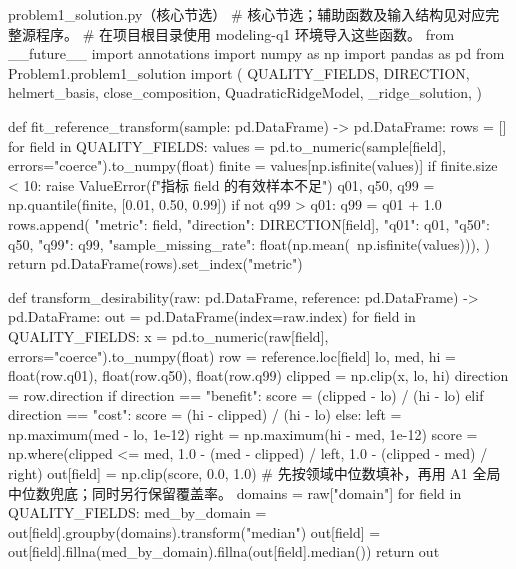 \documentclass[bwprint]{gmcmthesis}
\numberwithin{equation}{section}
\numberwithin{figure}{section}
\numberwithin{table}{section}
\begin{document}
\vspace{-2ex}
\begin{Python}{problem1\_solution.py（核心节选）}
# 核心节选；辅助函数及输入结构见对应完整源程序。
# 在项目根目录使用 modeling-q1 环境导入这些函数。
from __future__ import annotations
import numpy as np
import pandas as pd
from Problem1.problem1_solution import (
    QUALITY_FIELDS, DIRECTION, helmert_basis, close_composition,
    QuadraticRidgeModel, _ridge_solution,
)


def fit_reference_transform(sample: pd.DataFrame) -> pd.DataFrame:
    rows = []
    for field in QUALITY_FIELDS:
        values = pd.to_numeric(sample[field], errors="coerce").to_numpy(float)
        finite = values[np.isfinite(values)]
        if finite.size < 10:
            raise ValueError(f"指标 {field} 的有效样本不足")
        q01, q50, q99 = np.quantile(finite, [0.01, 0.50, 0.99])
        if not q99 > q01:
            q99 = q01 + 1.0
        rows.append(
            {
                "metric": field,
                "direction": DIRECTION[field],
                "q01": q01,
                "q50": q50,
                "q99": q99,
                "sample_missing_rate": float(np.mean(~np.isfinite(values))),
            }
        )
    return pd.DataFrame(rows).set_index("metric")


def transform_desirability(raw: pd.DataFrame, reference: pd.DataFrame) -> pd.DataFrame:
    out = pd.DataFrame(index=raw.index)
    for field in QUALITY_FIELDS:
        x = pd.to_numeric(raw[field], errors="coerce").to_numpy(float)
        row = reference.loc[field]
        lo, med, hi = float(row.q01), float(row.q50), float(row.q99)
        clipped = np.clip(x, lo, hi)
        direction = row.direction
        if direction == "benefit":
            score = (clipped - lo) / (hi - lo)
        elif direction == "cost":
            score = (hi - clipped) / (hi - lo)
        else:
            left = np.maximum(med - lo, 1e-12)
            right = np.maximum(hi - med, 1e-12)
            score = np.where(clipped <= med, 1.0 - (med - clipped) / left,
                             1.0 - (clipped - med) / right)
        out[field] = np.clip(score, 0.0, 1.0)
    # 先按领域中位数填补，再用 A1 全局中位数兜底；同时另行保留覆盖率。
    domains = raw["domain"]
    for field in QUALITY_FIELDS:
        med_by_domain = out[field].groupby(domains).transform("median")
        out[field] = out[field].fillna(med_by_domain).fillna(out[field].median())
    return out



\end{Python}
\end{document}
